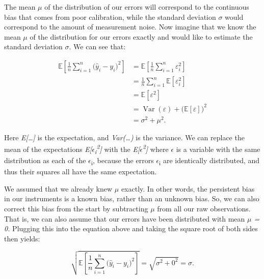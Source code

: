 \documentclass[12pt,a4paper]{report}
\numberwithin{equation}{section}
\begin{document}
The mean \emph{$\mu$} of the distribution of our errors will correspond to
the continuous bias that comes from poor calibration, while the standard
deviation \emph{$\sigma$} would correspond to the amount of measurement noise.
Now imagine that we know the mean \emph{$\mu$} of the distribution for our
errors exactly and would like to estimate the standard deviation
\emph{$\sigma$}. We can see that:

\begin{equation}\label{eq:4.1.5}
\begin{aligned}
\mathbb{E}\!\left[\frac{1}{n}\sum_{i=1}^{n}\bigl(\widehat{y}_i-y_i\bigr)^{2}\right]
&= \mathbb{E}\!\left[\frac{1}{n}\sum_{i=1}^{n}\varepsilon_i^{2}\right] \\
&= \frac{1}{n}\sum_{i=1}^{n}\mathbb{E}\!\left[\varepsilon_i^{2}\right] \\
&= \mathbb{E}\!\left[\varepsilon^{2}\right] \\
&= \operatorname{Var}(\varepsilon)+\bigl(\mathbb{E}[\varepsilon]\bigr)^{2} \\
&= \sigma^{2}+\mu^{2}.
\end{aligned}
\end{equation}


Here \emph{E{[}\ldots{]}} is the expectation, and \emph{Var(\ldots)} is
the variance. We can replace the mean of the expectations
\emph{E{[}$\epsilon$\textsubscript{i}\textsuperscript{2}{]}} with the \emph{E{[}$\epsilon$\textsuperscript{2}{]}} where \emph{$\epsilon$} is a variable
with the same distribution as each of the \emph{$\epsilon$}\textsubscript{i}, because the errors
$\epsilon$\textsubscript{i} are identically distributed, and thus their squares all have the same
expectation.

We assumed that we already knew \emph{$\mu$} exactly. In other words, the
persistent bias in our instruments is a known bias, rather than an
unknown bias. So, we can also correct this bias from the start by
subtracting $\mu$ from all our raw observations. That is, we can also assume
that our errors have been distributed with mean \emph{$\mu$ = 0.} Plugging
this into the equation above and taking the square root of both sides
then yields:

\begin{equation}\label{eq:4.1.6}
\sqrt{\mathbb{E}\!\left[\frac{1}{n}\sum_{i=1}^{n}\bigl(\widehat{y}_i-y_i\bigr)^{2}\right]}
= \sqrt{\sigma^{2}+0^{2}}
= \sigma .
\end{equation}
\end{document}
